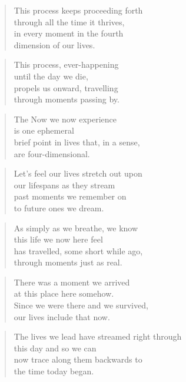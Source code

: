 \documentclass[10pt,a4paper]{article}
\begin{document}
\begin{paracol}{2}
\begin{verse}
This process keeps proceeding forth\\
through all the time it thrives,\\
in every moment in the fourth\\
dimension of our lives.
\end{verse}

\begin{verse}
This process, ever-happening\\
until the day we die,\\
propels us onward, travelling\\
through moments passing by.
\end{verse}

\begin{verse}
The Now we now experience\\
is one ephemeral\\
brief point in lives that, in a sense,\\
are four-dimensional.
\end{verse}

\begin{verse}
Let’s feel our lives stretch out upon\\
our lifespans as they stream\\
past moments we remember on\\
to future ones we dream.
\end{verse}

\begin{verse}
As simply as we breathe, we know\\
this life we now here feel\\
has travelled, some short while ago,\\
through moments just as real.
\end{verse}

\begin{verse}
There was a moment we arrived\\
at this place here somehow.\\
Since we were there and we survived,\\
our lives include that now.
\end{verse}

\begin{verse}
The lives we lead have streamed right through\\
this day and so we can\\
now trace along them backwards to\\
the time today began.
\end{verse}


\end{paracol}
\end{document}
